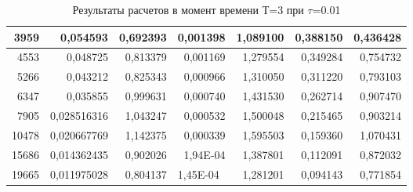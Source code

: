 \documentclass[14pt]{article}
\begin{document}
\begin{table}[!h!]
\begin{tabular}{|r|r|r|r|r|r|r|}
3959                    & 0,054593                         & 0,692393                  & 0,001398                      & 1,089100                  & 0,388150                    & 0,436428                    \\ \hline
4553                    & 0,048725   & 0,813379                  & 0,001169                      & 1,279554                  & 0,349284                    & 0,754732                    \\ \hline
5266                    & 0,043212                         & 0,825343                  & 0,000966                      & 1,310050                  & 0,311220                    & 0,793103                    \\ \hline
6347                    & 0,035855                         & 0,999631                  & 0,000740                      & 1,431530                  & 0,262714                    & 0,907470                    \\ \hline
7905                    & 0,028516316 & 1,043247                  & 0,000532                      & 1,500048                  & 0,215465                    & 0,903214                    \\ \hline
10478                   & 0,020667769 & 1,142375                  & 0,000339                      & 1,595503                  & 0,159360                    & 1,070431                    \\ \hline
15686                   & 0,014362435 & 0,902026                  & 1,94E-04 & 1,387801                  & 0,112091                    & 0,872032                    \\ \hline
19665                   & \multicolumn{1}{l|}{0,011975028} & 0,804137                  & \multicolumn{1}{l|}{1,45E-04} & 1,281201                  & 0,094143                    & 0,771854                    \\ \hline
\end{tabular}
\caption{Результаты расчетов в момент времени Т=3 при $\tau$=0.01}
\end{table}
\newpage
\end{document}
